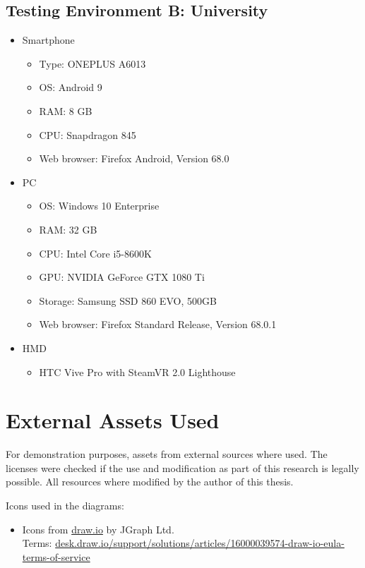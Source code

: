 \begin{appendices}
  \section{Testing Environment B: University}
  \begin{itemize}
    \item Smartphone
    \begin{itemize}
      \item Type: ONEPLUS A6013
      \item \gls{OS}: Android 9
      \item RAM: 8 GB
      \item CPU: Snapdragon 845 %
      \item Web browser: Firefox Android, Version 68.0
    \end{itemize}
    \item \gls{PC}
    \begin{itemize}
      \item \gls{OS}: Windows 10 Enterprise
      \item RAM: 32 GB
      \item CPU: Intel Core i5-8600K %
      \item GPU: NVIDIA GeForce GTX 1080 Ti
      \item Storage: Samsung SSD 860 EVO, 500GB
      \item Web browser: Firefox Standard Release, Version 68.0.1
    \end{itemize}
    \item \gls{HMD}
    \begin{itemize}
      \item HTC Vive Pro with SteamVR 2.0 Lighthouse
    \end{itemize}
  \end{itemize}

  \chapter{External Assets Used}\label{chapter:external-assets-used}
  
  For demonstration purposes, assets from external sources where used. The licenses were checked if the use and modification as part of this research is legally possible. All resources where modified by the author of this thesis.

  Icons used in the diagrams:
  \begin{itemize}
    \item Icons from \href{https://www.draw.io/}{draw.io} by JGraph Ltd.\\Terms: \href{https://desk.draw.io/support/solutions/articles/16000039574-draw-io-eula-terms-of-service}{desk.draw.io/support/solutions/articles/16000039574-draw-io-eula-terms-of-service}
  \end{itemize}


\end{appendices}
